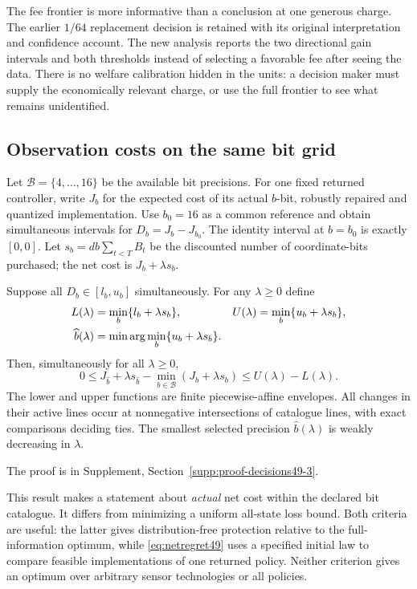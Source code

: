 The fee frontier is more informative than a conclusion at one generous charge. The earlier $1/64$ replacement decision is retained with its original interpretation and confidence account. The new analysis reports the two directional gain intervals and both thresholds instead of selecting a favorable fee after seeing the data. There is no welfare calibration hidden in the units: a decision maker must supply the economically relevant charge, or use the full frontier to see what remains unidentified.

\subsection{Observation costs on the same bit grid}
Let $\mathcal B=\{4,\ldots,16\}$ be the available bit precisions. For one fixed returned controller, write $J_b$ for the expected cost of its actual $b$-bit, robustly repaired and quantized implementation. Use $b_0=16$ as a common reference and obtain simultaneous intervals for $D_b=J_b-J_{b_0}$. The identity interval at $b=b_0$ is exactly $[0,0]$. Let $s_b=d b\sum_{t<T}B_t$ be the discounted number of coordinate-bits purchased; the net cost is $J_b+\lambda s_b$.

\begin{theorem}\label{thm:net49}
Suppose all $D_b\in[l_b,u_b]$ simultaneously. For any $\lambda\ge0$ define
\begin{align}\label{eq:net49}
 L(\lambda)&=\min_b\{l_b+\lambda s_b\},&
 U(\lambda)&=\min_b\{u_b+\lambda s_b\},\\
 \widehat b(\lambda)&=\min\arg\min_b\{u_b+\lambda s_b\}.\notag
\end{align}
Then, simultaneously for all $\lambda\ge0$,
\begin{equation}\label{eq:netregret49}
 0\le J_{\widehat b}+\lambda s_{\widehat b}
       -\min_{b\in\mathcal B}(J_b+\lambda s_b)
 \le U(\lambda)-L(\lambda).
\end{equation}
The lower and upper functions are finite piecewise-affine envelopes. All changes in their active lines occur at nonnegative intersections of catalogue lines, with exact comparisons deciding ties. The smallest selected precision $\widehat b(\lambda)$ is weakly decreasing in $\lambda$.
\end{theorem}
\noindent The proof is in Supplement, Section~\ref{supp:proof-decisions49-3}.


This result makes a statement about \emph{actual} net cost within the declared bit catalogue. It differs from minimizing a uniform all-state loss bound. Both criteria are useful: the latter gives distribution-free protection relative to the full-information optimum, while \eqref{eq:netregret49} uses a specified initial law to compare feasible implementations of one returned policy. Neither criterion gives an optimum over arbitrary sensor technologies or all policies.

